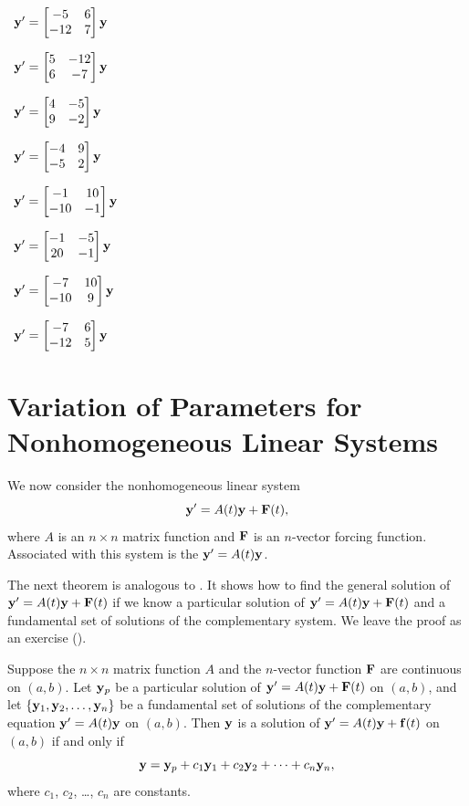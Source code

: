 \begin{exerciselistTwoColumn}
\item\label{exer:10.6.33}\CGex\,  $\mathbf{y}'=\begin{bmatrix}-5&6\\-12&7\end{bmatrix}\mathbf{y}$
\item\label{exer:10.6.34}\CGex\,  $\mathbf{y}'=\begin{bmatrix}5&-12\\6&-7\end{bmatrix}\mathbf{y}$
\item\label{exer:10.6.35}\CGex\,  $\mathbf{y}'=\begin{bmatrix}4&-5\\9&-2\end{bmatrix}\mathbf{y}$
\item\label{exer:10.6.36}\CGex\,  $\mathbf{y}'=\begin{bmatrix}-4&9\\-5&2\end{bmatrix}\mathbf{y}$
\item\label{exer:10.6.37}\CGex\,  $\mathbf{y}'=\begin{bmatrix}-1&10\\-10&-1\end{bmatrix}\mathbf{y}$
\item\label{exer:10.6.38}\CGex\,  $\mathbf{y}'=\begin{bmatrix}-1&-5\\20&-1\end{bmatrix}\mathbf{y}$
\item\label{exer:10.6.39}\CGex\,  $\mathbf{y}'=\begin{bmatrix}-7&10\\-10&9\end{bmatrix}\mathbf{y}$
\item\label{exer:10.6.40}\CGex\,  $\mathbf{y}'=\begin{bmatrix}-7&6\\-12&5\end{bmatrix}\mathbf{y}$

\end{exerciselistTwoColumn}


\section{Variation of Parameters for Nonhomogeneous Linear Systems}
\label{sec:systems_variation_param}

We now consider the nonhomogeneous linear system
\[
\mathbf{y}'= A(t)\mathbf{y}+\mathbf{F}(t),
\]
where $A$ is an $n\times n$ matrix function and $\mathbf{F}$ is an
$n$-vector forcing function. Associated with this system is the
 $\mathbf{y}'=A(t)\mathbf{y}$.

The next theorem is analogous to
. It shows how to find the general solution
of
$\mathbf{y}'=A(t)\mathbf{y}+\mathbf{F}(t)$ if we know a particular
solution
of $\mathbf{y}'=A(t)\mathbf{y}+\mathbf{F}(t)$ and a fundamental set of solutions of the
complementary system. We leave the proof as an exercise
().

\begin{theorem}\label{thmtype:10.7.1}
Suppose the $n\times n$ matrix function $A$ and the $n$-vector
function $\mathbf{F}$ are continuous on $(a,b)$. Let $\mathbf{y}_p$ be a
particular solution of $\mathbf{y}'=A(t)\mathbf{y}+\mathbf{F}(t)$ on $(a,b)$,
and let
$\{\mathbf{y}_1,\mathbf{y}_2,\dots,\mathbf{y}_n\}$ be a fundamental set of
solutions of the complementary equation $\mathbf{y}'=A(t)\mathbf{y}$ on
$(a,b)$. Then $\mathbf{y}$ is a solution of $\mathbf{y}'=A(t)\mathbf{y}+\mathbf{f}(t)$ on $(a,b)$ if and only if
\[
\mathbf{y}=\mathbf{y}_p+c_1\mathbf{y}_1+c_2\mathbf{y}_2+\cdots+c_n\mathbf{y}_n,
\]
where $c_1$, $c_2$, \dots, $c_n$  are constants.
\end{theorem}


